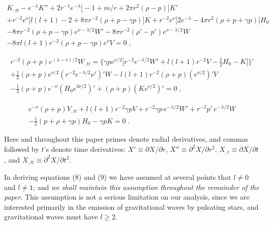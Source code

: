 \documentclass[12pt]{article}
\begin{document}
\begin{equation}
\begin{split}
K_{,tt} - e^{-\lambda}K'' + 2r^{-1}e^{-\lambda}\bigl[-1+m/r+2\pi r^2(\rho-p)\bigr]K' \\
+ r^{-2}e^{\nu}\bigl[l(l+1)-2+8\pi r^{-2}(\rho+p-\gamma p)\bigr]K
  + r^{-2}e^{\nu}\bigl[2e^{-\lambda}-4\pi r^2(\rho+p+\gamma p)\bigr]H_0 \\
- 8\pi r^{-2}(\rho+p-\gamma p)e^{\nu-\lambda/2}W'
  - 8\pi r^{-2}(\rho'-p')e^{\nu-\lambda/2}W \\
- 8\pi l(l+1)r^{-2}(\rho+p-\gamma p)e^{\nu}V = 0 \;,
\end{split}
\tag{9a}
\end{equation}

\begin{equation}
\begin{split}
r^{-2}(\rho+p)e^{(\lambda-\nu)/2}W_{,tt}
  = \bigl\{\gamma p e^{\nu/2}\bigl[r^{-2}e^{-\lambda/2}W'
    + l(l+1)r^{-2}V - \tfrac{1}{2}H_0 - K\bigr]\bigr\}' \\
+ \tfrac{1}{2}(\rho+p)e^{\nu/2}(r^{-2}e^{-\lambda/2}\nu')'W
  - l(l+1)r^{-2}(\rho+p)(e^{\nu/2})'V \\
- \tfrac{1}{2}(\rho+p)e^{-\nu}(H_0 e^{3\nu/2})'
  + (\rho+p)(Ke^{\nu/2})' = 0 \;,
\end{split}
\tag{9b}
\end{equation}

\begin{equation}
\begin{split}
e^{-\nu}(\rho+p)V_{,tt} + l(l+1)r^{-2}\gamma p V
  + r^{-2}\gamma p\,e^{-\lambda/2}W' + r^{-2}p'\,e^{-\lambda/2}W \\
- \tfrac{1}{2}(p+\rho+\gamma p)H_0 - \gamma p K = 0 \;.
\end{split}
\tag{9c}
\end{equation}

Here and throughout this paper primes denote radial derivatives, and commas followed
by $t$'s denote time derivatives: $X' \equiv \partial X/\partial r$, $X'' \equiv \partial^{2}X/\partial r^{2}$,
$X_{,t} \equiv \partial X/\partial t$, and $X_{,tt} \equiv \partial^{2}X/\partial t^{2}$.

In deriving equations (8) and (9) we have assumed at several points that $l \neq 0$ and
$l \neq 1$; and \textit{we shall maintain this assumption throughout the remainder of the paper}. This
assumption is not a serious limitation on our analysis, since we are interested primarily
in the emission of gravitational waves by pulsating stars, and gravitational waves must
have $l \geq 2$.
\end{document}
